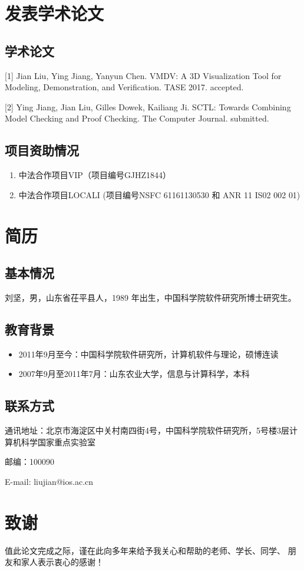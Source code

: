 \chapter{发表学术论文}

\section*{学术论文}

\hspace{-0.9cm}[1] Jian Liu, Ying Jiang, Yanyun Chen. VMDV: A 3D Visualization Tool for Modeling, Demonstration, and Verification. TASE 2017. accepted.

\hspace{-0.9cm}[2] Ying Jiang, Jian Liu, Gilles Dowek, Kailiang Ji. SCTL: Towards Combining Model Checking and Proof Checking. The Computer Journal. submitted.

\section*{项目资助情况}
\begin{enumerate}
	\item 中法合作项目VIP（项目编号GJHZ1844）
	\item 中法合作项目LOCALI (项目编号NSFC 61161130530 和 ANR 11 IS02 002 01)
\end{enumerate}



\chapter{简\quad 历}

\section*{基本情况}

刘坚，男，山东省茌平县人，1989 年出生，中国科学院软件研究所博士研究生。

\section*{教育背景}
\begin{itemize}
	\item 2011年9月至今：中国科学院软件研究所，计算机软件与理论，硕博连读
	\item 2007年9月至2011年7月：山东农业大学，信息与计算科学，本科
\end{itemize}

\section*{联系方式}

通讯地址：北京市海淀区中关村南四街4号，中国科学院软件研究所，5号楼3层计算机科学国家重点实验室

邮编：100090

E-mail: liujian@ios.ac.cn



\chapter{致\quad 谢}

值此论文完成之际，谨在此向多年来给予我关心和帮助的老师、学长、同学、
朋友和家人表示衷心的感谢！

\cleardoublepage[plain]%

